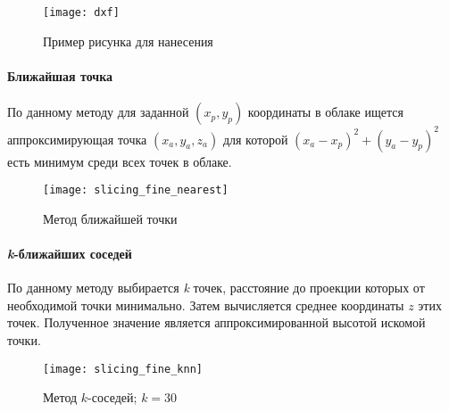          \begin{figure}[!ht]
             \centering
             \texttt{[image: dxf]}
             \caption{Пример рисунка для нанесения}
             \label{pic:dxf}
         \end{figure}
         
         \paragraph{Ближайшая точка}
         По данному методу для заданной $ (x_p,y_p) $ координаты в облаке ищется аппроксимирующая точка $ (x_a, y_a, z_a) $ для которой $ (x_a-x_p)^2 + (y_a-y_p)^2 $ есть минимум среди всех точек в облаке.
         
         \begin{figure}[H]
             \centering
             \texttt{[image: slicing\_fine\_nearest]}
             \caption{Метод ближайшей точки}
             \label{pic:slicing_nearest}
         \end{figure}
         
         \paragraph{\textit{k}-ближайших соседей}
         По данному методу выбирается \textit{k} точек, расстояние до проекции которых от необходимой точки минимально. Затем вычисляется среднее координаты $ z $ этих точек. Полученное значение является аппроксимированной высотой искомой точки.
         
         \begin{figure}[H]
             \centering
             \texttt{[image: slicing\_fine\_knn]}
             \caption{Метод $ k $-соседей; $ k=30 $}
             \label{pic:slicing_knn}
         \end{figure}
         
